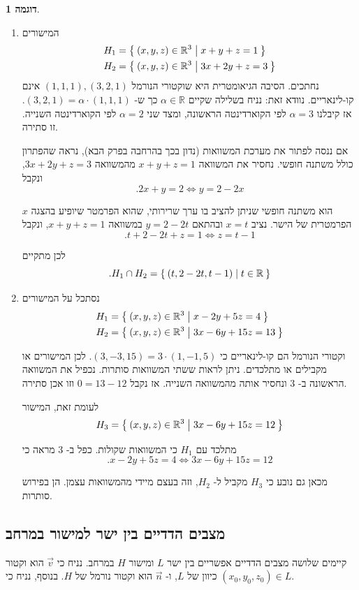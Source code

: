 \documentclass[12pt]{report}
\theoremstyle{plain}
\theoremstyle{definition}
\newtheorem{example}{דוגמה}[chapter]
\newcommand{\R}{\mathbb{R}}
\newcommand{\0}{\mathbf{0}}
\begin{document}

\begin{example}\
\begin{enumerate}[label=\alph*.]
\item 
המישורים
$$
\begin{aligned}
H_1&=\Set{(x,y,z)\in\R^3|x+y+z=1} \\
H_2&=\Set{(x,y,z)\in\R^3|3x+2y+z=3}
\end{aligned}
$$
נחתכים. הסיבה הגיאומטרית היא שוקטורי הנורמל
$(1,1,1),(3,2,1)$
אינם קו-לינאריים. נוודא זאת: נניח בשלילה שקיים
$\alpha\in\R$
כך ש-
$(3,2,1)=\alpha\cdot(1,1,1)$. 
אז קיבלנו
$\alpha=3$
לפי הקוארדינטה הראשונה, ומצד שני
$\alpha=2$
לפי הקוארדינטה השנייה. זו סתירה.

אם ננסה לפתור את מערכת המשוואות (נדון בכך בהרחבה בפרק הבא), נראה שהפתרון כולל משתנה חופשי. נחסיר את המשוואה
$x+y+z=1$
מהמשוואה 
$3x+2y+z=3$,
ונקבל
$$
.2x+y=2\iff y=2-2x
$$

$x$
הוא משתנה חופשי שניתן להציב בו ערך שרירותי, שהוא הפרמטר שיופיע בהצגה הפרמטרית של הישר.
נציב
$x=t$
ובהתאם
$y=2-2t$
במשוואה
$x+y+z=1$,
ונקבל
$$
.t+2-2t+z=1\iff z=t-1
$$

לכן מתקיים
$$
.H_1\cap H_2=\Set{(t,2-2t,t-1)|t\in\R}
$$

\item 
נסתכל על המישורים
$$
\begin{aligned}
H_1&=\Set{(x,y,z)\in\R^3|x-2y+5z=4} \\
H_2&=\Set{(x,y,z)\in\R^3|3x-6y+15z=13}
\end{aligned}
$$

וקטורי הנורמל הם קו-לינאריים כי
$(3,-3,15)=3\cdot (1,-1,5)$.
לכן המישורים או מקבילים או מתלכדים. ניתן לראות ששתי המשוואות סותרות. נכפיל את המשוואה הראשונה ב-
$3$
ונחסיר אותה מהמשוואה השנייה. אז נקבל
$
0=13-12
$
וזו אכן סתירה.

לעומת זאת, המישור
$$
H_3=\Set{(x,y,z)\in\R^3|3x-6y+15z=12}
$$

מתלכד עם
$H_1$
כי המשוואות שקולות. כפל ב-
$3$
מראה כי
$$
.x-2y+5z=4 \iff 3x-6y+15z=12
$$

מכאן גם נובע כי
$H_3$
מקביל ל-
$H_2$,
וזה בעצם מיידי מהמשוואות עצמן. הן בפירוש סותרות.

\end{enumerate}
\end{example}

\subsection{מצבים הדדיים בין ישר למישור במרחב}
קיימים שלושה מצבים הדדיים אפשריים בין ישר
$L$
ומישור
$H$
במרחב. נניח כי 
$\vec{v}$
הוא וקטור כיוון של
$L$,
ו-
$\vec{n}$
הוא וקטור נורמל של
$H$. בנוסף, נניח כי
$(x_0,y_0,z_0)\in L$.
\end{document}

